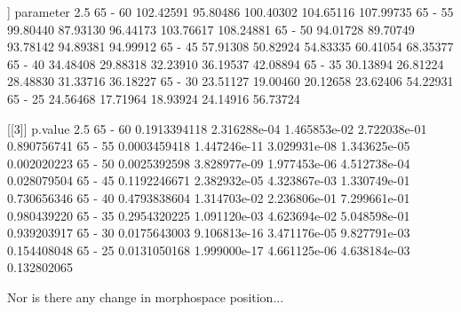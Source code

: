\documentclass{article}
\begin{document}
\begin{Schunk}
\begin{Soutput}
[[2]]
        parameter     2.5%       25%       75%     97.5%
65 - 60 102.42591 95.80486 100.40302 104.65116 107.99735
65 - 55  99.80440 87.93130  96.44173 103.76617 108.24881
65 - 50  94.01728 89.70749  93.78142  94.89381  94.99912
65 - 45  57.91308 50.82924  54.83335  60.41054  68.35377
65 - 40  34.48408 29.88318  32.23910  36.19537  42.08894
65 - 35  30.13894 26.81224  28.48830  31.33716  36.18227
65 - 30  23.51127 19.00460  20.12658  23.62406  54.22931
65 - 25  24.56468 17.71964  18.93924  24.14916  56.73724

[[3]]
             p.value         2.5%          25%          75%       97.5%
65 - 60 0.1913394118 2.316288e-04 1.465853e-02 2.722038e-01 0.890756741
65 - 55 0.0003459418 1.447246e-11 3.029931e-08 1.343625e-05 0.002020223
65 - 50 0.0025392598 3.828977e-09 1.977453e-06 4.512738e-04 0.028079504
65 - 45 0.1192246671 2.382932e-05 4.323867e-03 1.330749e-01 0.730656346
65 - 40 0.4793838604 1.314703e-02 2.236806e-01 7.299661e-01 0.980439220
65 - 35 0.2954320225 1.091120e-03 4.623694e-02 5.048598e-01 0.939203917
65 - 30 0.0175643003 9.106813e-16 3.471176e-05 9.827791e-03 0.154408048
65 - 25 0.0131050168 1.999000e-17 4.661125e-06 4.638184e-03 0.132802065
\end{Soutput}
\end{Schunk}

Nor is there any change in morphospace position...
\end{document}
